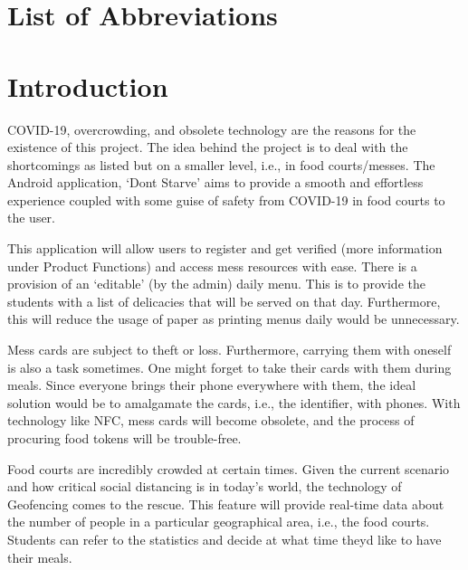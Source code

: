\documentclass[12pt]{article}
\begin{document}
\section*{\LARGE{List of Abbreviations}}
\printnoidxglossary[type=\acronymtype,title=Acronyms,nonumberlist]
\printnoidxglossary[title=Description,nonumberlist]
\newpage

\section*{\LARGE{Introduction}}
COVID-19, overcrowding, and obsolete technology are the reasons for the existence of this project. The idea behind the project is to deal with the shortcomings as listed but on a smaller level, i.e., in food courts/messes. The Android application, `Don\textquotesingle t Starve' aims to provide a smooth and effortless experience coupled with some guise of safety from COVID-19 in food courts to the user.\par \vskip0.3cm
This application will allow users to register and get verified (more information under Product Functions) and access mess resources with ease. There is a provision of an `editable' (by the admin) daily menu. This is to provide the students with a list of delicacies that will be served on that day. Furthermore, this will reduce the usage of paper as printing menus daily would be unnecessary.\par \vskip0.3cm
Mess cards are subject to theft or loss. Furthermore, carrying them with oneself is also a task sometimes. One might forget to take their cards with them during meals. Since everyone brings their phone everywhere with them, the ideal solution would be to amalgamate the cards, i.e., the identifier, with phones. With technology like NFC, mess cards will become obsolete, and the process of procuring food tokens will be trouble-free.\par \vskip0.3cm
Food courts are incredibly crowded at certain times. Given the current scenario and how critical social distancing is in today's world, the technology of Geofencing comes to the rescue. This feature will provide real-time data about the number of people in a particular geographical area, i.e., the food courts. Students can refer to the statistics and decide at what time they\textquotesingle d like to have their meals.\par \vskip0.3cm
\end{document}
